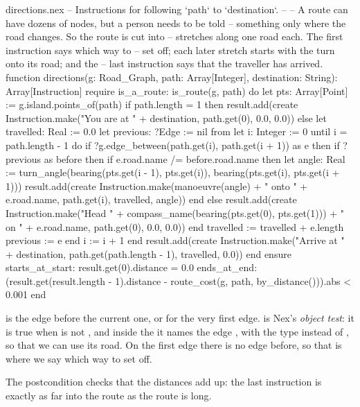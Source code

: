 \begin{append}{directions.nex}
-- Instructions for following `path` to `destination`.
--
-- A route can have dozens of nodes, but a person needs to be told
-- something only where the road changes. So the route is cut into
-- stretches along one road each. The first instruction says which way to
-- set off; each later stretch starts with the turn onto its road; and the
-- last instruction says that the traveller has arrived.
function directions(g: Road_Graph, path: Array[Integer], destination: String): Array[Instruction]
require
  is_a_route: is_route(g, path)
do
  let pts: Array[Point] := g.island.points_of(path)
  if path.length = 1 then
    result.add(create Instruction.make("You are at " + destination, path.get(0), 0.0, 0.0))
  else
    let travelled: Real := 0.0
    let previous: ?Edge := nil
    from
      let i: Integer := 0
    until
      i = path.length - 1
    do
      if ?g.edge_between(path.get(i), path.get(i + 1)) as e then
        if ?previous as before then
          if e.road.name /= before.road.name then
            let angle: Real := turn_angle(bearing(pts.get(i - 1), pts.get(i)),
              bearing(pts.get(i), pts.get(i + 1)))
            result.add(create Instruction.make(manoeuvre(angle) + " onto " + e.road.name,
              path.get(i), travelled, angle))
          end
        else
          result.add(create Instruction.make("Head "
            + compass_name(bearing(pts.get(0), pts.get(1))) + " on " + e.road.name,
            path.get(0), 0.0, 0.0))
        end
        travelled := travelled + e.length
        previous := e
      end
      i := i + 1
    end
    result.add(create Instruction.make("Arrive at " + destination,
      path.get(path.length - 1), travelled, 0.0))
  end
ensure
  starts_at_start: result.get(0).distance = 0.0
  ends_at_end: (result.get(result.length - 1).distance
    - route_cost(g, path, by_distance())).abs < 0.001
end
\end{append}

 is the edge before the current one, or  for the
very first edge.  is Nex's \emph{object test}:
it is true when  is not , and inside the
 it names the edge , with the type 
instead of , so that we can use its road. On the first edge
there is no edge before, so that is where we say which way to set off.

The postcondition checks that the distances add up: the last instruction
is exactly as far into the route as the route is long.


